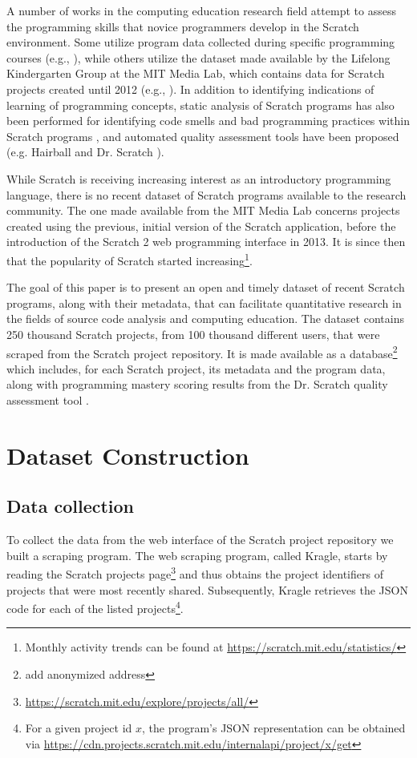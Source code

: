 \documentclass[10pt, conference]{IEEEtran}
\begin{document}
A number of works in the computing education research field attempt to assess the programming skills that novice programmers develop in the Scratch environment.
Some utilize program data collected during specific programming courses (e.g., \cite{meerbaum-salant_learning_2010, wilson_evaluation_2012, Maloney_2008}), while others utilize the dataset made available by the Lifelong Kindergarten Group at the MIT Media Lab, which contains data for Scratch projects created until 2012 (e.g., \cite{fields_2014, yang_2015, Dasgupta_2016}).
In addition to identifying indications of learning of programming concepts, static analysis of Scratch programs has also been performed for identifying code smells and bad programming practices within Scratch programs \cite{Meerbaum_habits_2011, Aivaloglou_2016}, and automated quality assessment tools have been proposed (e.g. Hairball \cite{boe_hairball:_2013} and Dr. Scratch \cite{moreno_automatic_2014}).

While Scratch is receiving increasing interest as an introductory programming language, there is no recent dataset of Scratch programs available to the research community.
The one made available from the MIT Media Lab concerns projects created using the previous, initial version of the Scratch application, before the introduction of the Scratch 2 web programming interface in 2013.
It is since then that the popularity of Scratch started increasing\footnote{Monthly activity trends can be found at \url{https://scratch.mit.edu/statistics/}}.

The goal of this paper is to present an open and timely dataset of recent Scratch programs, along with their metadata, that can facilitate quantitative research in the fields of source code analysis and computing education.
The dataset contains 250 thousand Scratch projects, from 100 thousand different users, that were scraped from the Scratch project repository.
It is made available as a database\footnote{{add anonymized address}} which includes, for each Scratch project, its metadata and the program data, along with programming mastery scoring results from the Dr. Scratch quality assessment tool \cite{moreno_automatic_2014}.

\section{Dataset Construction}
\label{dataset}

\subsection{Data collection}
To collect the data from the web interface of the Scratch project repository we built a scraping program.
The web scraping program, called Kragle, starts by reading the Scratch projects page\footnote{\label{scratchpublic}\url{https://scratch.mit.edu/explore/projects/all/}} and thus obtains the project identifiers of projects that were most recently shared.
Subsequently, Kragle retrieves the JSON code for each of the listed projects\footnote{For a given project id $x$, the program's JSON representation can be obtained via \url{https://cdn.projects.scratch.mit.edu/internalapi/project/x/get}}.
\end{document}
